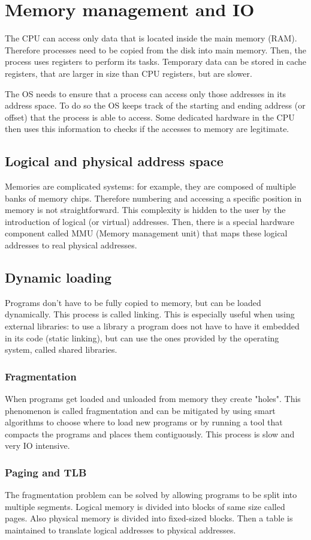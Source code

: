\chapter{Memory management and IO}

The CPU can access only data that is located inside the main memory (RAM). Therefore processes need to be copied from the disk into main memory. Then, the process uses registers to perform its tasks. Temporary data can be stored in cache registers, that are larger in size than CPU registers, but are slower.


The OS needs to ensure that a process can access only those addresses in its address space. To do so the OS keeps track of the starting and ending address (or offset) that the process is able to access. Some dedicated hardware in the CPU then uses this information to checks if the accesses to memory are legitimate.

\section{Logical and physical address space}
Memories are complicated systems: for example, they are composed of multiple banks of memory chips. Therefore numbering and accessing a specific position in memory is not straightforward. This complexity is hidden to the user by the introduction of logical (or virtual) addresses. Then, there is a special hardware component called MMU (Memory management unit) that maps these logical addresses to real physical addresses.

\section{Dynamic loading}
Programs don't have to be fully copied to memory, but can be loaded dynamically. This process is called linking. This is especially useful when using external libraries: to use a library a program does not have to have it embedded in its code (static linking), but can use the ones provided by the operating system, called shared libraries.

\subsection{Fragmentation}
When programs get loaded and unloaded from memory they create "holes". This phenomenon is called fragmentation and can be mitigated by using smart algorithms to choose where to load new programs or by running a tool that compacts the programs and places them contiguously. This process is slow and very IO intensive.

\subsection{Paging and TLB}
The fragmentation problem can be solved by allowing programs to be split into multiple segments. Logical memory is divided into blocks of same size called pages. Also physical memory is divided into fixed-sized blocks. Then a table is maintained to translate logical addresses to physical addresses.